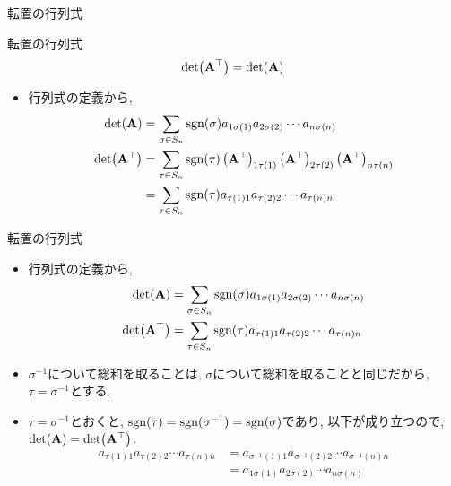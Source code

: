 \documentclass[dvipdfmx,notheorems,t]{beamer}
\begin{document}
\begin{frame}{転置の行列式}
\begin{block}{転置の行列式}
  $$\det(\vb{A}^\top) = \det(\vb{A})$$
\end{block}

\begin{itemize}
  \item 行列式の定義から,
  \begin{align*}
    \det(\vb{A}) &= \sum_{\sigma \in S_n} \operatorname{sgn}(\sigma)
      a_{1 \sigma(1)} a_{2 \sigma(2)} \cdots a_{n \sigma(n)} \\
    \det(\vb{A}^\top) &= \sum_{\tau \in S_n} \operatorname{sgn}(\tau)
      \left( \vb{A}^\top \right)_{1 \tau(1)} \left( \vb{A}^\top \right)_{2 \tau(2)}
      \left( \vb{A}^\top \right)_{n \tau(n)} \\
      &= \sum_{\tau \in S_n} \operatorname{sgn}(\tau)
        a_{\tau(1) 1} a_{\tau(2) 2} \cdots a_{\tau(n) n}
  \end{align*}
\end{itemize}
\end{frame}

\begin{frame}{転置の行列式}
\begin{itemize}
  \item 行列式の定義から,
  \begin{align*}
    \det(\vb{A}) &= \sum_{\sigma \in S_n} \operatorname{sgn}(\sigma)
      a_{1 \sigma(1)} a_{2 \sigma(2)} \cdots a_{n \sigma(n)} \\
    \det(\vb{A}^\top) &= \sum_{\tau \in S_n} \operatorname{sgn}(\tau)
      a_{\tau(1) 1} a_{\tau(2) 2} \cdots a_{\tau(n) n}
  \end{align*}
  \item $\sigma^{-1}$について総和を取ることは, $\sigma$について総和を取ることと同じだから, 
  $\tau = \sigma^{-1}$とする.
  \item $\tau = \sigma^{-1}$とおくと, $\operatorname{sgn}(\tau) = \operatorname{sgn}(\sigma^{-1}) = \operatorname{sgn}(\sigma)$であり,
  以下が成り立つので, $\det(\vb{A}) = \det(\vb{A}^\top)$.
  \begin{align*}
    a_{\tau(1) 1} a_{\tau(2) 2} \cdots a_{\tau(n) n}
      &= a_{\sigma^{-1}(1) 1} a_{\sigma^{-1}(2) 2} \cdots a_{\sigma^{-1}(n) n} \\
      &= a_{1 \sigma(1)} a_{2 \sigma(2)} \cdots a_{n \sigma(n)}
  \end{align*}
\end{itemize}
\end{frame}
\end{document}

